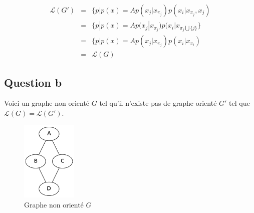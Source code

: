 \documentclass{article}
\begin{document}
\begin{align}
\mathcal{L}(G') & = & \{ p | p(x) = A p(x_j | x_{\pi_j}) p(x_i | x_{\pi_j}, x_j) \\
	        & = & \{ p | p(x) = A p(x_j | x_{\pi_j}) p(x_i | x_{\pi_j \bigcup \{j\}} \} \\
		& = & \{ p | p(x) = A p(x_j | x_{\pi_j}) p(x_i | x_{\pi_i}) \\
		& = & \mathcal{L}(G)
\end{align}


\subsection{Question b}
Voici un graphe non orienté $G$ tel qu'il n'existe pas de graphe orienté $G'$ tel que $\mathcal{L}(G) = \mathcal{L}(G')$.

\begin{figure}[h]
\caption{Graphe non orienté $G$}
\includegraphics[width=100px]{Ia.png}
\end{figure}
\end{document}
